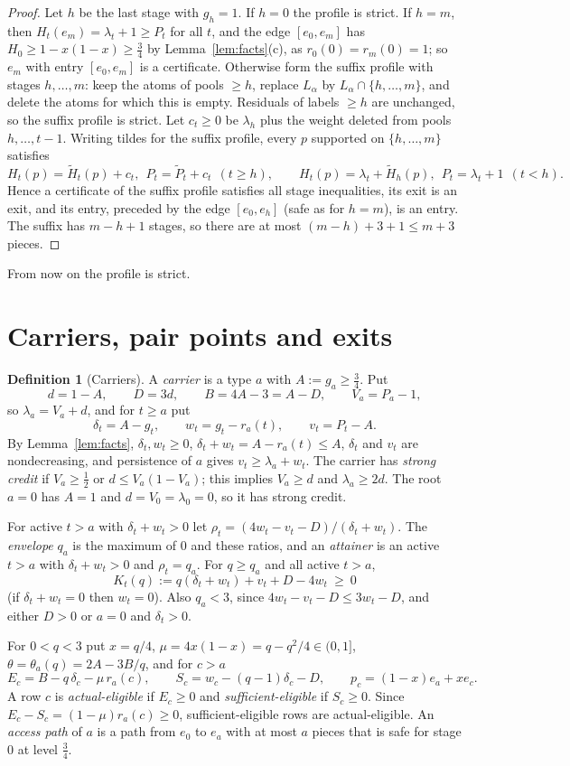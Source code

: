 \documentclass[11pt,a4paper]{article}
\numberwithin{equation}{section}
\theoremstyle{definition}
\newtheorem{definition}[theorem]{Definition}
\begin{document}
\begin{proof}
Let $h$ be the last stage with $g_h=1$. If $h=0$ the profile is strict. If
$h=m$, then $H_t(e_m)=\lambda_t+1\ge P_t$ for all $t$, and the edge
$[e_0,e_m]$ has $H_0\ge1-x(1-x)\ge\frac34$ by Lemma~\ref{lem:facts}(c), as
$r_0(0)=r_m(0)=1$; so $e_m$ with entry $[e_0,e_m]$ is a certificate. Otherwise
form the suffix profile with stages $h,\dots,m$: keep the atoms of pools $\ge h$,
replace $L_\alpha$ by $L_\alpha\cap\{h,\dots,m\}$, and delete the atoms for
which this is empty. Residuals of labels $\ge h$ are unchanged, so the suffix
profile is strict. Let $c_t\ge0$ be $\lambda_h$ plus the weight deleted from
pools $h,\dots,t-1$. Writing tildes for the suffix profile, every $p$ supported
on $\{h,\dots,m\}$ satisfies
\[
H_t(p)=\tilde H_t(p)+c_t,\ \ P_t=\tilde P_t+c_t\ \ (t\ge h),\qquad
H_t(p)=\lambda_t+\tilde H_h(p),\ \ P_t=\lambda_t+1\ \ (t<h).
\]
Hence a certificate of the suffix profile satisfies all stage inequalities, its
exit is an exit, and its entry, preceded by the edge $[e_0,e_h]$ (safe as for
$h=m$), is an entry. The suffix has $m-h+1$ stages, so there are at most
$(m-h)+3+1\le m+3$ pieces.
\end{proof}

From now on the profile is strict.

\section{Carriers, pair points and exits}\label{sec:carriers}

\begin{definition}[Carriers]\label{def:carrier}
A \emph{carrier} is a type $a$ with $A:=g_a\ge\frac34$. Put
\[
d=1-A,\qquad D=3d,\qquad B=4A-3=A-D,\qquad V_a=P_a-1,
\]
so $\lambda_a=V_a+d$, and for $t\ge a$ put
\[
\delta_t=A-g_t,\qquad w_t=g_t-r_a(t),\qquad v_t=P_t-A.
\]
By Lemma~\ref{lem:facts}, $\delta_t,w_t\ge0$, $\delta_t+w_t=A-r_a(t)\le A$,
$\delta_t$ and $v_t$ are nondecreasing, and persistence of $a$ gives
$v_t\ge\lambda_a+w_t$. The carrier has \emph{strong credit} if $V_a\ge\frac12$
or $d\le V_a(1-V_a)$; this implies $V_a\ge d$ and $\lambda_a\ge2d$. The root
$a=0$ has $A=1$ and $d=V_0=\lambda_0=0$, so it has strong credit.

For active $t>a$ with $\delta_t+w_t>0$ let
$\rho_t=(4w_t-v_t-D)/(\delta_t+w_t)$. The \emph{envelope} $q_a$ is the maximum
of $0$ and these ratios, and an \emph{attainer} is an active $t>a$ with
$\delta_t+w_t>0$ and $\rho_t=q_a$. For $q\ge q_a$ and all active $t>a$,
\[
K_t(q):=q(\delta_t+w_t)+v_t+D-4w_t\ \ge\ 0
\]
(if $\delta_t+w_t=0$ then $w_t=0$). Also $q_a<3$, since $4w_t-v_t-D\le3w_t-D$,
and either $D>0$ or $a=0$ and $\delta_t>0$.

For $0<q<3$ put $x=q/4$, $\mu=4x(1-x)=q-q^2/4\in(0,1]$, $\theta=\theta_a(q)=2A-3B/q$,
and for $c>a$
\[
E_c=B-q\,\delta_c-\mu\,r_a(c),\qquad S_c=w_c-(q-1)\delta_c-D,\qquad
p_c=(1-x)e_a+xe_c.
\]
A row $c$ is \emph{actual-eligible} if $E_c\ge0$ and \emph{sufficient-eligible}
if $S_c\ge0$. Since $E_c-S_c=(1-\mu)r_a(c)\ge0$, sufficient-eligible rows are
actual-eligible. An \emph{access path} of $a$ is a path from $e_0$ to $e_a$ with
at most $a$ pieces that is safe for stage $0$ at level $\frac34$.
\end{definition}
\end{document}
